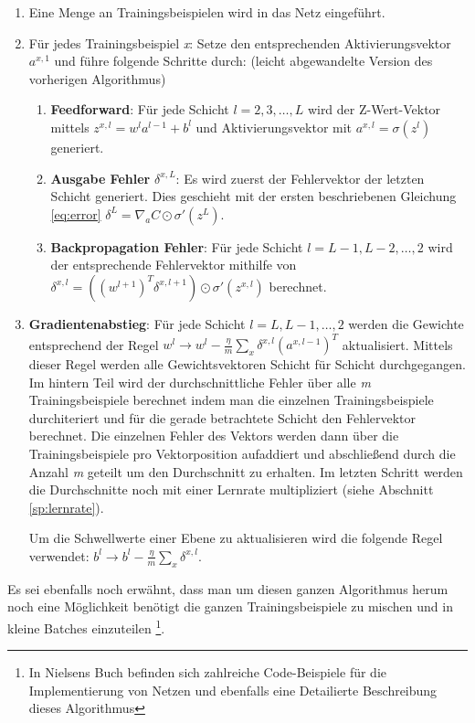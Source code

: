 \begin{enumerate}

\item Eine Menge an Trainingsbeispielen wird in das Netz eingeführt.

\item Für jedes Trainingsbeispiel \emph{x}: Setze den entsprechenden Aktivierungsvektor $a^{x,1}$ und führe folgende Schritte durch: (leicht abgewandelte Version des vorherigen Algorithmus)
\begin{enumerate}

	\item \textbf{Feedforward}: Für jede Schicht $l = 2, 3, \ldots, L$ wird der Z-Wert-Vektor mittels $z^{x,l} = w^l a^{l-1}+b^l$ und Aktivierungsvektor mit $a^{x,l} = \sigma(z^{l})$ generiert.
	
	\item \textbf{Ausgabe Fehler} $\delta^{x,L}$: Es wird zuerst der Fehlervektor der letzten Schicht generiert. Dies geschieht mit der ersten beschriebenen Gleichung \ref{eq:error} $\delta^{L}  = \nabla_a C \odot \sigma'(z^L)$. 
	
	\item \textbf{Backpropagation Fehler}: Für jede Schicht $l = L-1, L-2, \ldots, 2$ wird der entsprechende Fehlervektor mithilfe von $\delta^{x,l} = ((w^{l+1})^T \delta^{x,l+1}) \odot \sigma'(z^{x,l})$ berechnet. 
\end{enumerate}

\item \textbf{Gradientenabstieg}: Für jede Schicht $l = L, L-1, \ldots, 2$ werden die Gewichte entsprechend der Regel $w^l \rightarrow w^l-\frac{\eta}{m} \sum_x \delta^{x,l} (a^{x,l-1})^T$ aktualisiert. Mittels dieser Regel werden alle Gewichtsvektoren Schicht für Schicht durchgegangen. Im hintern Teil wird der durchschnittliche Fehler über alle \emph{m} Trainingsbeispiele berechnet indem man die einzelnen Trainingsbeispiele durchiteriert und für die gerade betrachtete Schicht den Fehlervektor berechnet. Die einzelnen Fehler des Vektors werden dann über die Trainingsbeispiele pro Vektorposition aufaddiert und abschließend durch die Anzahl \emph{m} geteilt um den Durchschnitt zu erhalten. Im letzten Schritt werden die Durchschnitte noch mit einer Lernrate multipliziert (siehe Abschnitt \ref{sp:lernrate}). 

Um die Schwellwerte einer Ebene zu aktualisieren wird die folgende Regel verwendet: $b^l \rightarrow b^l-\frac{\eta}{m} \sum_x \delta^{x,l}$.

\end{enumerate} 


Es sei ebenfalls noch erwähnt, dass man um diesen ganzen Algorithmus herum noch eine Möglichkeit benötigt die ganzen Trainingsbeispiele zu mischen und in kleine Batches einzuteilen \footnote{In Nielsens Buch \cite{dlnielsen} befinden sich zahlreiche Code-Beispiele für die Implementierung von Netzen und ebenfalls eine Detailierte Beschreibung dieses Algorithmus}. 
